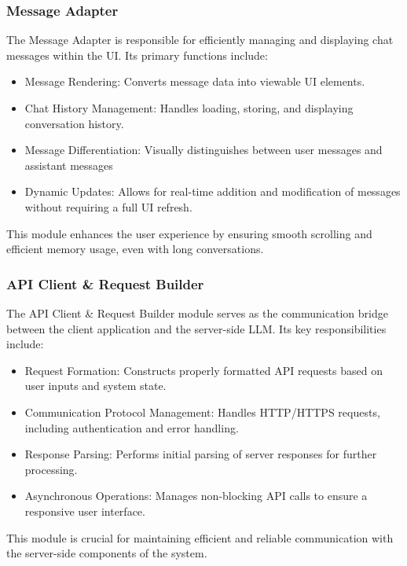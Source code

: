 \subsubsection{Message Adapter}
\label{subsec:messageadapter}
The Message Adapter is responsible for efficiently managing and displaying chat messages within the UI. Its primary functions include:
\begin{itemize}
    \item Message Rendering: Converts message data into viewable UI elements.
    \item Chat History Management: Handles loading, storing, and displaying conversation history.
    \item Message Differentiation: Visually distinguishes between user messages and assistant messages
    \item Dynamic Updates: Allows for real-time addition and modification of messages without requiring a full UI refresh.
\end{itemize}
This module enhances the user experience by ensuring smooth scrolling and efficient memory usage, even with long conversations.

\subsubsection{API Client \& Request Builder}
\label{subsec:apiclient}
The API Client \& Request Builder module serves as the communication bridge between the client application and the server-side LLM. Its key responsibilities include:
\begin{itemize}
    \item Request Formation: Constructs properly formatted API requests based on user inputs and system state.
    \item Communication Protocol Management: Handles HTTP/HTTPS requests, including authentication and error handling.
    \item Response Parsing: Performs initial parsing of server responses for further processing.
    \item Asynchronous Operations: Manages non-blocking API calls to ensure a responsive user interface.
\end{itemize}
This module is crucial for maintaining efficient and reliable communication with the server-side components of the system.


